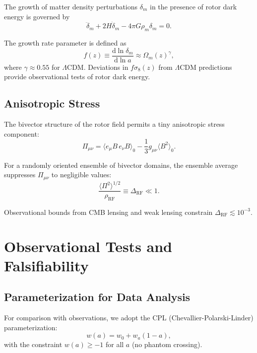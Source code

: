 \documentclass[11pt,a4paper]{article}
\numberwithin{equation}{section}
\theoremstyle{plain}
\theoremstyle{definition}
\theoremstyle{remark}
\newcommand{\dd}{\mathrm{d}}
\begin{document}
The growth of matter density perturbations $\delta_m$ in the presence of rotor dark energy is governed by
\begin{equation}
\ddot{\delta}_m + 2H\dot{\delta}_m - 4\pi G\rho_m\delta_m = 0.
\label{eq:matter-growth}
\end{equation}

The growth rate parameter is defined as
\begin{equation}
f(z) \equiv \frac{\dd \ln \delta_m}{\dd \ln a} \approx \Omega_m(z)^\gamma,
\end{equation}
where $\gamma \approx 0.55$ for $\Lambda$CDM. Deviations in $f\sigma_8(z)$ from $\Lambda$CDM predictions provide observational tests of rotor dark energy.

\subsection{Anisotropic Stress}

The bivector structure of the rotor field permits a tiny anisotropic stress component:
\begin{equation}
\Pi_{\mu\nu} = \langle e_\mu B \, e_\nu B \rangle_0 - \frac{1}{3}g_{\mu\nu}\langle B^2 \rangle_0.
\end{equation}

For a randomly oriented ensemble of bivector domains, the ensemble average suppresses $\Pi_{\mu\nu}$ to negligible values:
\begin{equation}
\frac{\langle \Pi^2 \rangle^{1/2}}{\rho_{\mathrm{RF}}} \equiv \Delta_{\mathrm{RF}} \ll 1.
\end{equation}

Observational bounds from CMB lensing and weak lensing constrain $\Delta_{\mathrm{RF}} \lesssim 10^{-3}$.

\section{Observational Tests and Falsifiability}
\label{sec:obs}

\subsection{Parameterization for Data Analysis}

For comparison with observations, we adopt the CPL (Chevallier-Polarski-Linder) parameterization:
\begin{equation}
w(a) = w_0 + w_a(1-a),
\label{eq:cpl}
\end{equation}
with the constraint $w(a) \geq -1$ for all $a$ (no phantom crossing).
\end{document}
